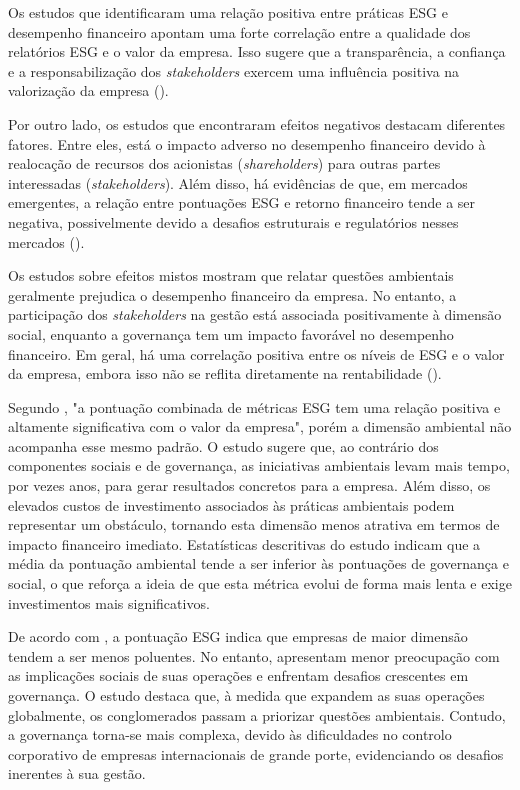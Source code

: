 Os estudos que identificaram uma relação positiva entre práticas \gls{ESG} e desempenho financeiro apontam uma forte correlação entre a qualidade dos relatórios \gls{ESG} e o valor da empresa. Isso sugere que a transparência, a confiança e a responsabilização dos \textit{stakeholders} exercem uma influência positiva na valorização da empresa (\cite{Aydomu2022}).

Por outro lado, os estudos que encontraram efeitos negativos destacam diferentes fatores. Entre eles, está o impacto adverso no desempenho financeiro devido à realocação de recursos dos acionistas (\textit{shareholders}) para outras partes interessadas (\textit{stakeholders}). Além disso, há evidências de que, em mercados emergentes, a relação entre pontuações \gls{ESG} e retorno financeiro tende a ser negativa, possivelmente devido a desafios estruturais e regulatórios nesses mercados (\cite{Aydomu2022}).

Os estudos sobre efeitos mistos mostram que relatar questões ambientais geralmente prejudica o desempenho financeiro da empresa. No entanto, a participação dos \textit{stakeholders} na gestão está associada positivamente à dimensão social, enquanto a governança tem um impacto favorável no desempenho financeiro. Em geral, há uma correlação positiva entre os níveis de \gls{ESG} e o valor da empresa, embora isso não se reflita diretamente na rentabilidade (\cite{Aydomu2022}).

Segundo \cite{Aydomu2022}, "a pontuação combinada de métricas \gls{ESG} tem uma relação positiva e altamente significativa com o valor da empresa", porém a dimensão ambiental não acompanha esse mesmo padrão. O estudo sugere que, ao contrário dos componentes sociais e de governança, as iniciativas ambientais levam mais tempo, por vezes anos, para gerar resultados concretos para a empresa. Além disso, os elevados custos de investimento associados às práticas ambientais podem representar um obstáculo, tornando esta dimensão menos atrativa em termos de impacto financeiro imediato. Estatísticas descritivas do estudo indicam que a média da pontuação ambiental tende a ser inferior às pontuações de governança e social, o que reforça a ideia de que esta métrica evolui de forma mais lenta e exige investimentos mais significativos.

De acordo com \cite{Cohen2023}, a pontuação \gls{ESG} indica que empresas de maior dimensão tendem a ser menos poluentes. No entanto, apresentam menor preocupação com as implicações sociais de suas operações e enfrentam desafios crescentes em governança. O estudo destaca que, à medida que expandem as suas operações globalmente, os conglomerados passam a priorizar questões ambientais. Contudo, a governança torna-se mais complexa, devido às dificuldades no controlo corporativo de empresas internacionais de grande porte, evidenciando os desafios inerentes à sua gestão.

